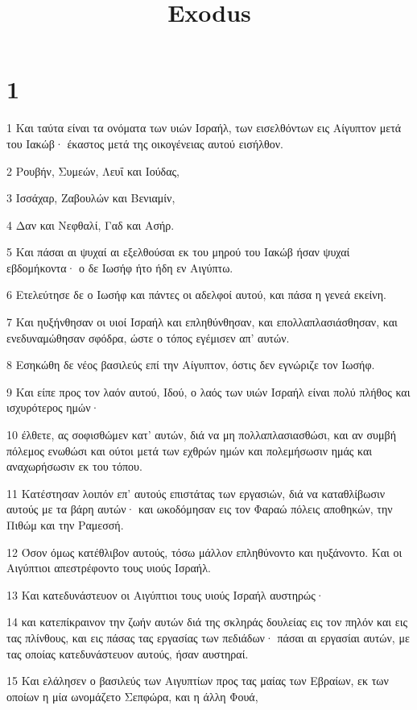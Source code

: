 

\title{Exodus}


\chapter{1}

\par 1 Και ταύτα είναι τα ονόματα των υιών Ισραήλ, των εισελθόντων εις Αίγυπτον μετά του Ιακώβ· έκαστος μετά της οικογένειας αυτού εισήλθον.
\par 2 Ρουβήν, Συμεών, Λευΐ και Ιούδας,
\par 3 Ισσάχαρ, Ζαβουλών και Βενιαμίν,
\par 4 Δαν και Νεφθαλί, Γαδ και Ασήρ.
\par 5 Και πάσαι αι ψυχαί αι εξελθούσαι εκ του μηρού του Ιακώβ ήσαν ψυχαί εβδομήκοντα· ο δε Ιωσήφ ήτο ήδη εν Αιγύπτω.
\par 6 Ετελεύτησε δε ο Ιωσήφ και πάντες οι αδελφοί αυτού, και πάσα η γενεά εκείνη.
\par 7 Και ηυξήνθησαν οι υιοί Ισραήλ και επληθύνθησαν, και επολλαπλασιάσθησαν, και ενεδυναμώθησαν σφόδρα, ώστε ο τόπος εγέμισεν απ' αυτών.
\par 8 Εσηκώθη δε νέος βασιλεύς επί την Αίγυπτον, όστις δεν εγνώριζε τον Ιωσήφ.
\par 9 Και είπε προς τον λαόν αυτού, Ιδού, ο λαός των υιών Ισραήλ είναι πολύ πλήθος και ισχυρότερος ημών·
\par 10 έλθετε, ας σοφισθώμεν κατ' αυτών, διά να μη πολλαπλασιασθώσι, και αν συμβή πόλεμος ενωθώσι και ούτοι μετά των εχθρών ημών και πολεμήσωσιν ημάς και αναχωρήσωσιν εκ του τόπου.
\par 11 Κατέστησαν λοιπόν επ' αυτούς επιστάτας των εργασιών, διά να καταθλίβωσιν αυτούς με τα βάρη αυτών· και ωκοδόμησαν εις τον Φαραώ πόλεις αποθηκών, την Πιθώμ και την Ραμεσσή.
\par 12 Όσον όμως κατέθλιβον αυτούς, τόσω μάλλον επληθύνοντο και ηυξάνοντο. Και οι Αιγύπτιοι απεστρέφοντο τους υιούς Ισραήλ.
\par 13 Και κατεδυνάστευον οι Αιγύπτιοι τους υιούς Ισραήλ αυστηρώς·
\par 14 και κατεπίκραινον την ζωήν αυτών διά της σκληράς δουλείας εις τον πηλόν και εις τας πλίνθους, και εις πάσας τας εργασίας των πεδιάδων· πάσαι αι εργασίαι αυτών, με τας οποίας κατεδυνάστευον αυτούς, ήσαν αυστηραί.
\par 15 Και ελάλησεν ο βασιλεύς των Αιγυπτίων προς τας μαίας των Εβραίων, εκ των οποίων η μία ωνομάζετο Σεπφώρα, και η άλλη Φουά,
